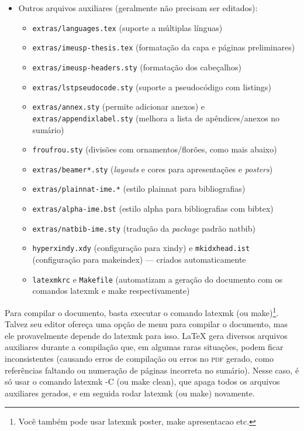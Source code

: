 \begin{itemize}
  \item Outros arquivos auxiliares (geralmente não precisam ser editados):
  \begin{itemize}
    \item \texttt{extras/languages.tex} (suporte a múltiplas línguas)
    \item \texttt{extras/imeusp-thesis.tex} (formatação da capa e páginas preliminares)
    \item \texttt{extras/imeusp-headers.sty} (formatação dos cabeçalhos)
    \item \texttt{extras/lstpseudocode.sty} (suporte a pseudocódigo com \textsf{listings})
    \item \texttt{extras/annex.sty} (permite adicionar anexos) e
          \texttt{extras/appendixlabel.sty} (melhora a lista de
          apêndices/anexos no sumário)
    \item \texttt{froufrou.sty} (divisões com ornamentos/florões, como mais abaixo)
    \item \texttt{extras/beamer*.sty} (\textit{layouts} e cores para
          apresentações e \textit{posters})
    \item \texttt{extras/plainnat-ime.*} (estilo plainnat para bibliografias)
    \item \texttt{extras/alpha-ime.bst} (estilo alpha para bibliografias com
          bibtex)
    \item \texttt{extras/natbib-ime.sty} (tradução da \textit{package}
          padrão natbib)
    \item \texttt{hyperxindy.xdy} (configuração para xindy) e
          \texttt{mkidxhead.ist} (configuração para makeindex) --- criados automaticamente
    \item \texttt{latexmkrc} e \texttt{Makefile} (automatizam a geração do
          documento com os comandos \textsf{latexmk} e \textsf{make} respectivamente)
  \end{itemize}
\end{itemize}

\froufrou

Para compilar o documento, basta executar o comando \textsf{latexmk} (ou
\textsf{make})\footnote{Você também pode usar \textsf{latexmk poster},
\textsf{make apresentacao} etc.}. Talvez seu editor ofereça uma
opção de menu para compilar o documento, mas ele provavelmente depende do
\textsf{latexmk} para isso. \LaTeX{} gera diversos arquivos auxiliares
durante a compilação que, em algumas raras situações, podem ficar
inconsistentes (causando erros de compilação ou erros no \textsc{pdf} gerado,
como referências faltando ou numeração de páginas incorreta no sumário).
Nesse caso, é só usar o comando \textsf{latexmk -C} (ou \textsf{make clean}),
que apaga todos os arquivos auxiliares gerados, e em seguida rodar
\textsf{latexmk} (ou \textsf{make}) novamente.

